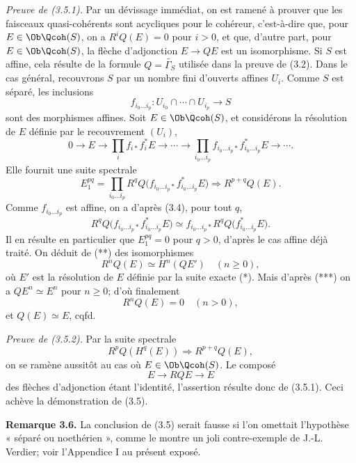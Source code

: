 \documentclass[11pt]{article}
\begin{document}
\emph{Preuve de (3.5.1).} Par un dévissage immédiat, on est ramené à prouver que les faisceaux quasi-cohérents sont acycliques pour le cohéreur, c'est-à-dire que, pour $E\in\Ob\Qcoh(S)$, on a $R^iQ(E)=0$ pour $i>0$, et que, d'autre part, pour $E\in\Ob\Qcoh(S)$, la flèche d'adjonction $E\to QE$ est un isomorphisme. Si $S$ est affine, cela résulte de la formule $Q=\widetilde{\Gamma_S}$ utilisée dans la preuve de (3.2). Dans le cas général, recouvrons $S$ par un nombre fini d'ouverts affines $U_i$. Comme $S$ est séparé, les inclusions
\[
 f_{i_0\ldots i_p}:U_{i_0}\cap\cdots\cap U_{i_p}\longrightarrow S
\]
sont des morphismes affines. Soit $E\in\Ob\Qcoh(S)$, et considérons la résolution de $E$ définie par le recouvrement $(U_i)$,
\begin{equation}\tag{*}
 0\longrightarrow E\longrightarrow \prod_i f_{i*}f_i^*E\longrightarrow\cdots\longrightarrow
 \prod_{i_0\ldots i_p}f_{i_0\ldots i_p*}f_{i_0\ldots i_p}^*E\longrightarrow\cdots .
\end{equation}
Elle fournit une suite spectrale
\begin{equation}\tag{**}
 E_1^{pq}=\prod_{i_0\ldots i_p}R^qQ\bigl(f_{i_0\ldots i_p*}f_{i_0\ldots i_p}^*E\bigr)
 \Longrightarrow R^{p+q}Q(E).
\end{equation}
Comme $f_{i_0\ldots i_p}$ est affine, on a d'après (3.4), pour tout $q$,
\begin{equation}\tag{***}
 R^qQ\bigl(f_{i_0\ldots i_p*}f_{i_0\ldots i_p}^*E\bigr)
 \simeq f_{i_0\ldots i_p*}R^qQ\bigl(f_{i_0\ldots i_p}^*E\bigr).
\end{equation}
Il en résulte en particulier que $E_1^{pq}=0$ pour $q>0$, d'après le cas affine déjà traité. On déduit de (**) des isomorphismes
\[
 R^nQ(E)\simeq H^n(QE')\quad(n\geq0),
\]
où $E'$ est la résolution de $E$ définie par la suite exacte (*). Mais d'après (***) on a $QE^n\simeq E^n$ pour $n\geq0$; d'où finalement
\[
 R^nQ(E)=0\quad(n>0),
\]
et $Q(E)\simeq E$, cqfd.

\emph{Preuve de (3.5.2).} Par la suite spectrale
\[
 R^pQ(H^q(E))\Longrightarrow R^{p+q}Q(E),
\]
on se ramène aussitôt au cas où $E\in\Ob\Qcoh(S)$. Le composé
\[
 E\longrightarrow RQE\longrightarrow E
\]
des flèches d'adjonction étant l'identité, l'assertion résulte donc de (3.5.1). Ceci achève la démonstration de (3.5).

\textbf{Remarque 3.6.} La conclusion de (3.5) serait fausse si l'on omettait l'hypothèse « séparé ou noethérien », comme le montre un joli contre-exemple de J.-L. Verdier; voir l'Appendice I au présent exposé.
\end{document}

